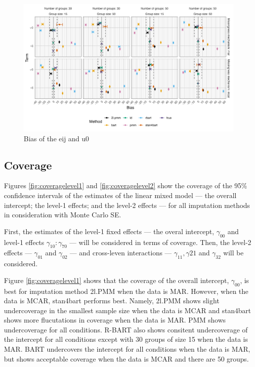 \documentclass[preprint,12pt]{elsarticle}
\begin{document}
\begin{figure}[H]
    \centering
    \includegraphics[width=1\textwidth]{bias2.png}
    \caption{Bias of the eij and u0}
    \label{fig:bias2}
\end{figure}

\subsection{Coverage}
Figures \ref{fig:coveragelevel1} and \ref{fig:coveragelevel2} show the coverage of the 95\% confidence intervals of the estimates of the linear mixed model --- the overall intercept; the level-1 effects; and the level-2 effects --- for all imputation methods in consideration with Monte Carlo SE.

First, the estimates of the level-1 fixed effects --- the overal intercept, $\gamma_{00}$ and level-1 effects $\gamma_{10}:\gamma_{70}$ --- will be considered in terms of coverage. Then, the level-2 effects --- $\gamma_{01}$ and $\gamma_{02}$ --- and cross-leven interactions --- $\gamma_{11}, \gamma{21}$ and $\gamma_{32}$ will be considered.

Figure \ref{fig:coveragelevel1} shows that the coverage of the overall intercept, $\gamma_{00}$, is best for imputation method 2l.PMM when the data is MAR. However, when the data is MCAR, stan4bart performs best. Namely, 2l.PMM shows slight undercoverage in the smallest sample size when the data is MCAR and stan4bart shows more flucutations in coverage when the data is MAR. PMM shows undercoverage for all conditions. R-BART also shows consitent undercoverage of the intercept for all conditions except with 30 groups of size 15 when the data is MAR. BART undercovers the intercept for all conditions when the data is MAR, but shows acceptable coverage when the data is MCAR and there are 50 groups. 
\end{document}
